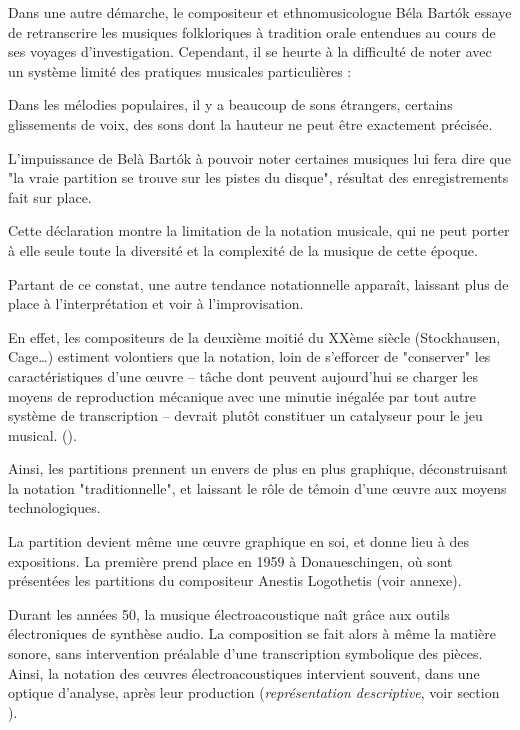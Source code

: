 Dans une autre démarche, le compositeur et ethnomusicologue Béla Bart\'{o}k essaye de retranscrire les musiques folkloriques à tradition orale entendues au cours de ses voyages d'investigation.
Cependant, il se heurte à la difficulté de noter avec un système limité des pratiques musicales particulières :

\begin{displayquote}
\og Dans les mélodies populaires, il y a beaucoup de sons étrangers, certains glissements de voix, des sons dont la hauteur ne peut être exactement précisée.\fg 
\end{displayquote}


L'impuissance de Belà Bart\'{o}k à pouvoir noter certaines musiques lui fera dire que "la vraie partition se trouve sur les pistes du disque", résultat des enregistrements fait sur place.

Cette déclaration montre la limitation de la notation musicale, qui ne peut porter à elle seule toute la diversité et la complexité de la musique de cette époque.

Partant de ce constat, une autre tendance notationnelle apparaît, laissant plus de place à l'interprétation et voir à l'improvisation. 

En effet, les compositeurs de la deuxième moitié du XXème siècle (Stockhausen, Cage…) \og estiment volontiers que la notation, loin de s'efforcer de "conserver" les caractéristiques d'une œuvre -- tâche dont peuvent aujourd'hui se charger les moyens de reproduction mécanique avec une minutie inégalée par tout autre système de transcription -- devrait plutôt constituer un catalyseur pour le jeu musical. \fg (\cite[115]{bosseur2005}).

Ainsi, les partitions prennent un envers de plus en plus graphique, déconstruisant la notation "traditionnelle", et laissant le rôle de témoin d'une œuvre aux moyens technologiques.

La partition devient même une œuvre graphique en soi, et donne lieu à des expositions. La première prend place en 1959 à Donaueschingen, où sont présentées les partitions du compositeur Anestis Logothetis (voir annexe).

Durant les années 50, la musique électroacoustique naît grâce aux outils électroniques de synthèse audio.
La composition se fait alors à même la matière sonore, sans intervention préalable d'une transcription symbolique des pièces.
Ainsi, la notation des œuvres électroacoustiques intervient souvent, dans une optique d'analyse, après leur production (\textit{représentation descriptive}, voir section ).

